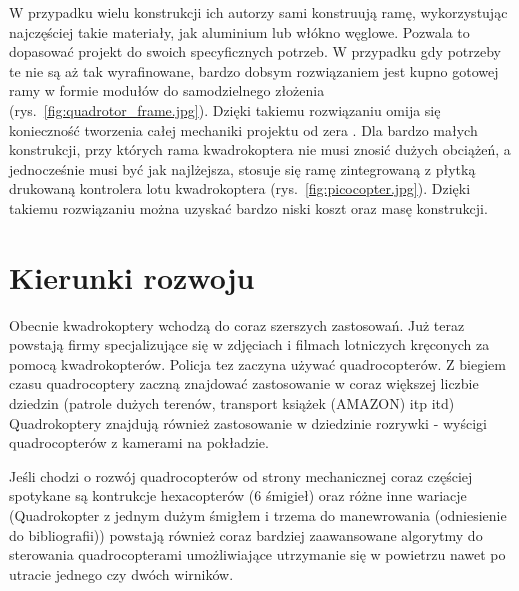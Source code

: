 W przypadku wielu konstrukcji ich autorzy sami konstruują ramę, wykorzystując najczęściej takie materiały, jak aluminium lub włókno węglowe. Pozwala to dopasować projekt do swoich specyficznych potrzeb. W przypadku gdy potrzeby te nie są aż tak wyrafinowane, bardzo dobsym rozwiązaniem jest kupno gotowej ramy w formie modułów do samodzielnego złożenia (rys.~\ref{fig:quadrotor_frame.jpg}). Dzięki takiemu rozwiązaniu omija się konieczność tworzenia całej mechaniki projektu od zera . Dla bardzo małych konstrukcji, przy których rama kwadrokoptera nie musi znosić dużych obciążeń, a jednocześnie musi być jak najlżejsza, stosuje się ramę zintegrowaną z płytką drukowaną kontrolera lotu kwadrokoptera (rys.~\ref{fig:picocopter.jpg}). Dzięki takiemu rozwiązaniu można uzyskać bardzo niski koszt oraz masę konstrukcji. 


\section{Kierunki rozwoju}

Obecnie kwadrokoptery wchodzą do coraz szerszych zastosowań. Już teraz powstają firmy specjalizujące się w zdjęciach i filmach lotniczych kręconych za pomocą kwadrokopterów. Policja tez zaczyna używać quadrocopterów. Z biegiem czasu quadrocoptery zaczną znajdować zastosowanie w coraz większej liczbie dziedzin (patrole dużych terenów, transport książek (AMAZON) itp itd) Quadrokoptery znajdują również zastosowanie w dziedzinie rozrywki - wyścigi quadrocopterów z kamerami na pokładzie.

Jeśli chodzi o rozwój quadrocopterów od strony mechanicznej coraz częściej spotykane są kontrukcje hexacopterów (6 śmigieł) oraz różne inne wariacje (Quadrokopter z jednym dużym śmigłem i trzema do manewrowania (odniesienie do bibliografii)) powstają również coraz bardziej zaawansowane algorytmy do sterowania quadrocopterami umożliwiające utrzymanie się w powietrzu nawet po utracie jednego czy dwóch wirników.
